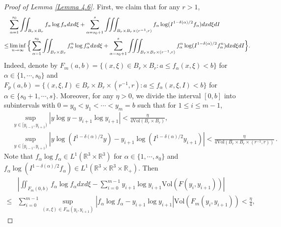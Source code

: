\documentclass[reqno,11pt]{amsart}
\numberwithin{equation}{section}
\def\R{\mathbb{R}}
\begin{document}
\begin{proof}[Proof of Lemma \ref{Lemma 4.6}]
	First, we claim that for any $ r> 1$, 
	\begin{equation}\label{eq4.29}{\small
		\begin{aligned}
  & \sum_{\alpha = 1}^{s_0} \iint_{B_r \times B_r} f_\alpha \log f_\alpha dxd\xi + \sum_{\alpha = s_0 + 1}^{s} \iiint_{B_r \times B_r \times (r^{-1}, r) } f_\alpha \log (I^{1-\delta(\alpha )/2 } f_\alpha) dxd\xi dI \\
\leq & \liminf \limits_{n\rightarrow \infty } \Big\{ \sum_{\alpha = 1}^{s_0} \iint_{B_r \times B_r } f^n_\alpha \log f^n_\alpha dxd\xi + \sum_{\alpha = s_0 + 1}^{s} \iiint_{B_r \times B_r \times (r^{-1},r) } f^n_\alpha \log (I^{1-\delta(\alpha)/2}f^n_\alpha) dxd\xi dI \Big\} .
\end{aligned}}
	\end{equation}
Indeed, denote by $F_m(a,b) = \{ (x,\xi) \in B_r \times B_r : a \leq f_\alpha (x, \xi) <b \}$ for $\alpha \in \{ 1, \cdots, s_0 \}$ and $F_p (a,b) = \{ (x,\xi, I) \in B_r \times B_r\times (r^{-1}, r) : a \leq f_\alpha (x, \xi, I) <b \}$ for $\alpha \in \{ s_0 + 1, \cdots, s \}$. Moreover, for any $\eta > 0$, we divide the interval $[0,b]$ into subintervals with $0 = y_0 < y_1 <\cdots < y_m =b$ such that for $1 \leq i \leq m-1$,
	\begin{equation}\label{eq4.32}
\begin{aligned}
		& \sup \limits_{y\in [y_{i-1} ,y_{i+1}) } |y \log y - y_{i+1} \log y_{i+1} | <\tfrac{\eta}{4 \mathrm{Vol} (B_r \times B_r)} , \\ 
& \sup \limits_{y\in [y_{i-1} ,y_{i+1}) } |y \log ( I^{1 - \delta (\alpha) / 2} y ) - y_{i+1} \log  ( I^{1 - \delta (\alpha) /2} y_{i+1} ) | <\tfrac{\eta}{4 \mathrm{Vol} (B_r \times B_r \times (r^{-1},r ))} \,.
\end{aligned}
	\end{equation}
Note that $f_\alpha \log f_\alpha \in L^1 (\R^3 \times \R^3) $ for $\alpha \in \{ 1, \cdots, s_0 \}$ and $f_\alpha \log ( I^{1 - \delta (\alpha) / 2} f_\alpha ) \in L^1 (\R^3 \times \R^3 \times \R_+) $. Then
	\begin{equation}\label{V1}
		\begin{aligned}
			& |\iint_{F_m(0,b)} f_\alpha \log f_\alpha  dxd\xi  - \sum_{i=0}^{m-1} y_{i+1} \log y_{i+1} \mathrm{Vol} (F(y_i, y_{i+1})) | \\
			\leq & \sum_{i=0}^{m-1} \sup \limits_{(x,\xi) \in F_m (y_i ,y_{i+1})} |f_\alpha \log f_\alpha  - y_{i+1} \log y_{i+1} | \mathrm{Vol} (F_m (y_i, y_{i+1})) < \tfrac{\eta }{4},

\end{aligned}
\end{equation}
\end{proof}
\end{document}
